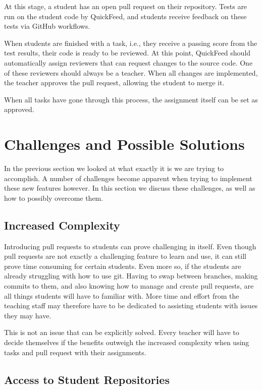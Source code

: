 At this stage, a student has an open pull request on their repository.
Tests are run on the student code by QuickFeed, and students receive feedback on these tests via GitHub workflows.

When students are finished with a task, i.e., they receive a passing score from the test results, their code is ready to be reviewed.
At this point, QuickFeed should automatically assign reviewers that can request changes to the source code.
One of these reviewers should always be a teacher.
When all changes are implemented, the teacher approves the pull request, allowing the student to merge it.

When all tasks have gone through this process, the assignment itself can be set as approved.

\section{Challenges and Possible Solutions}

In the previous section we looked at what exactly it is we are trying to accomplish. 
A number of challenges become apparent when trying to implement these new features however.
In this section we discuss these challenges, as well as how to possibly overcome them.

\subsection{Increased Complexity}

Introducing pull requests to students can prove challenging in itself.
Even though pull requests are not exactly a challenging feature to learn and use, it can still prove time consuming for certain students.
Even more so, if the students are already struggling with how to use git.
Having to swap between branches, making commits to them, and also knowing how to manage and create pull requests, are all things students will have to familiar with.
More time and effort from the teaching staff may therefore have to be dedicated to assisting students with issues they may have.

This is not an issue that can be explicitly solved.
Every teacher will have to decide themselves if the benefits outweigh the increased complexity when using tasks and pull request with their assignments.

\subsection{Access to Student Repositories}

